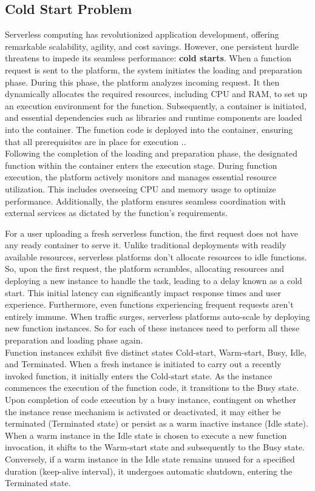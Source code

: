 \subsection{Cold Start Problem}

Serverless computing has revolutionized application development, offering remarkable scalability, agility, and cost savings. However, one persistent hurdle threatens to impede its seamless performance: \textbf{cold starts}. When a function request is sent to the platform, the system initiates the loading and preparation phase. During this phase, the platform analyzes incoming request. It then dynamically allocates the required resources, including CPU and RAM, to set up an execution environment for the function. Subsequently, a container is initiated, and essential dependencies such as libraries and runtime components are loaded into the container. The function code is deployed into the container, ensuring that all prerequisites are in place for execution \cite{GWK+23, LWC+23}..\\

Following the completion of the loading and preparation phase, the designated function within the container enters the execution stage. During function execution, the platform actively monitors and manages essential resource utilization. This includes overseeing CPU and memory usage to optimize performance. Additionally, the platform ensures seamless coordination with external services as dictated by the function's requirements\cite{GWK+23, LWC+23}.

For a user uploading a fresh serverless function, the first request does not have any ready container to serve it. Unlike traditional deployments with readily available resources, serverless platforms don't allocate resources to idle functions. So, upon the first request, the platform scrambles, allocating resources and deploying a new instance to handle the task, leading to a delay known as a cold start. This initial latency can significantly impact response times and user experience. Furthermore, even functions experiencing frequent requests aren't entirely immune. When traffic surges, serverless platforms auto-scale by deploying new function instances. So for each of these instances need to perform all these preparation and loading phase again\cite{LYYO21}.\\

Function instances exhibit five distinct states Cold-start, Warm-start, Busy, Idle, and Terminated. When a fresh instance is initiated to carry out a recently invoked function, it initially enters the Cold-start state. As the instance commences the execution of the function code, it transitions to the Busy state. Upon completion of code execution by a busy instance, contingent on whether the instance reuse mechanism is activated or deactivated, it may either be terminated (Terminated state) or persist as a warm inactive instance (Idle state). When a warm instance in the Idle state is chosen to execute a new function invocation, it shifts to the Warm-start state and subsequently to the Busy state. Conversely, if a warm instance in the Idle state remains unused for a specified duration (keep-alive interval), it undergoes automatic shutdown, entering the Terminated state\cite{MHS+23,KS23}.


